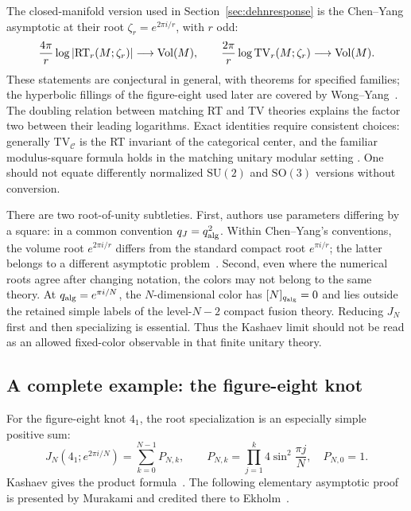 The closed-manifold version used in Section~\ref{sec:dehnresponse}
is the Chen--Yang asymptotic at their root $\zeta_r=e^{2\pi i/r}$,
with $r$ odd:
\begin{equation}
 \frac{4\pi}{r}\log|\mathrm{RT}_r(M;\zeta_r)|\longrightarrow\operatorname{Vol}(M),
 \qquad
 \frac{2\pi}{r}\log\mathrm{TV}_r(M;\zeta_r)\longrightarrow\operatorname{Vol}(M).
 \label{eq:introclosedvolume}
\end{equation}
These statements are conjectural in general, with theorems for
specified families; the hyperbolic fillings of the figure-eight used
later are covered by Wong--Yang~\cite{WongYangDehn}. The doubling
relation between matching RT and TV theories explains the factor
two between their leading logarithms. Exact identities require
consistent choices: generally $\mathrm{TV}_{\mathcal C}$ is the RT
invariant of the categorical center, and the familiar modulus-square
formula holds in the matching unitary modular setting
\cite{TuraevVirelizier}. One should not equate differently normalized
$\mathrm{SU}(2)$ and $\mathrm{SO}(3)$ versions without conversion.

There are two root-of-unity subtleties. First, authors use parameters
differing by a square: in a common convention $q_J=q_{\rm alg}^2$.
Within Chen--Yang's conventions, the volume root $e^{2\pi i/r}$
differs from the standard compact root $e^{\pi i/r}$; the latter
belongs to a different asymptotic problem~\cite{ChenYang}.
Second, even where the numerical roots agree after changing notation,
the colors may not belong to the same theory. At
$q_{\rm alg}=e^{\pi i/N}$, the $N$-dimensional color has
$[N]_{q_{\rm alg}}=0$ and lies outside the retained simple labels
of the level-$N-2$ compact fusion theory. Reducing $J_N$ first and
then specializing is essential. Thus the Kashaev limit should not
be read as an allowed fixed-color observable in that finite unitary
theory.

\subsection{A complete example: the figure-eight knot}
\label{sec:introfigureeight}

For the figure-eight knot $4_1$, the root specialization is an
especially simple positive sum:
\begin{equation}
 \boxed{\quad
 J_N(4_1;e^{2\pi i/N})=\sum_{k=0}^{N-1}P_{N,k},\qquad
 P_{N,k}=\prod_{j=1}^{k}4\sin^2\frac{\pi j}{N},\quad P_{N,0}=1.
 \quad}
 \label{eq:introfigureproduct}
\end{equation}
Kashaev gives the product formula~\cite[eqs. (2.2), (2.5)]{KashaevVolume}.
The following elementary asymptotic proof is presented by
Murakami and credited there to Ekholm~\cite[Section 3.2]{MurakamiIntro}.


